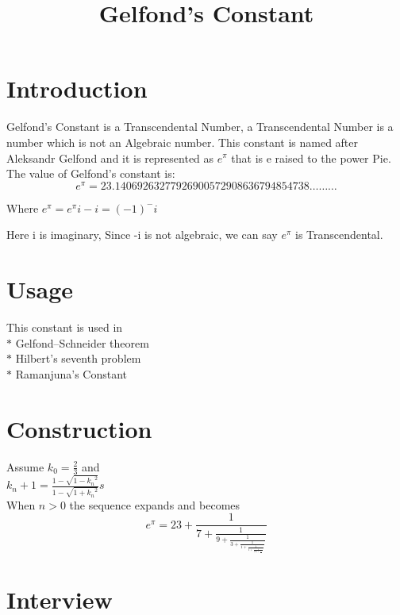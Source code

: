\documentclass[12pt]{article}
\title{\textbf{\huge Gelfond's Constant\vspace{-4ex}}%
}
\date{}
\begin{document}
    \maketitle
\section*{Introduction\vspace{-2ex}}
Gelfond's Constant is a Transcendental Number,  a Transcendental Number is a number which is not an Algebraic number. This constant is named after Aleksandr Gelfond and it is represented as
$e^\pi$  that is e raised to the power Pie.\\

The value of Gelfond's constant is:
$$e^\pi  =23.14069263277926900572908636794854738………$$

Where     $e^\pi= {e^{\pi} i}-i= (-1)^-i$ \par

Here i is imaginary, Since -i is not algebraic, we can say $e^\pi$ is Transcendental.

\section*{Usage\vspace{-2ex}}
This constant is used in \\
    $* $ Gelfond–Schneider theorem\\
    $* $ Hilbert's seventh problem\\
    $* $ Ramanjuna’s Constant\\

\section*{Construction\vspace{-2ex}}
Assume   $\displaystyle{k_0=  \frac{2}{3}}$  and\\
$\displaystyle{k_n+1 = \frac{1-\sqrt{1-{k_n}^2}}{1-\sqrt{1+{k_n}^2}}}s$\\

When $n>0$ the sequence expands and becomes\\
{\Large$$e^\pi = 23 + \frac{1}{7 + \frac{1}{9 + \frac{1}{3 + \frac{1}{1 + \frac{1}{1 + \frac{1}{591 + \frac{1}{...}}}}}}}$$}

\section*{\centering Interview}
\end{document}
